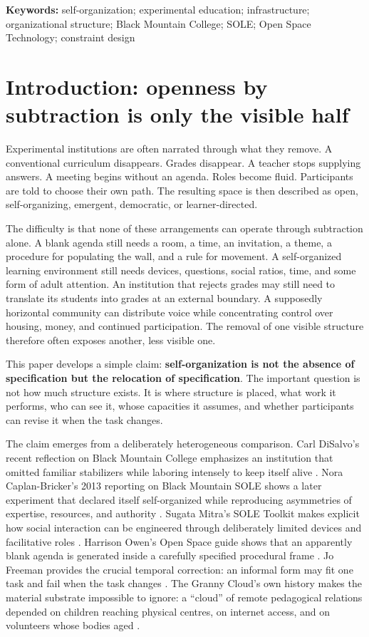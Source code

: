 \documentclass[11pt]{article}
\begin{document}
\textbf{Keywords:} self-organization; experimental education; infrastructure; organizational structure; Black Mountain College; SOLE; Open Space Technology; constraint design

\section{Introduction: openness by subtraction is only the visible half}

Experimental institutions are often narrated through what they remove. A conventional curriculum disappears. Grades disappear. A teacher stops supplying answers. A meeting begins without an agenda. Roles become fluid. Participants are told to choose their own path. The resulting space is then described as open, self-organizing, emergent, democratic, or learner-directed.

The difficulty is that none of these arrangements can operate through subtraction alone. A blank agenda still needs a room, a time, an invitation, a theme, a procedure for populating the wall, and a rule for movement. A self-organized learning environment still needs devices, questions, social ratios, time, and some form of adult attention. An institution that rejects grades may still need to translate its students into grades at an external boundary. A supposedly horizontal community can distribute voice while concentrating control over housing, money, and continued participation. The removal of one visible structure therefore often exposes another, less visible one.

This paper develops a simple claim: \textbf{self-organization is not the absence of specification but the relocation of specification}. The important question is not how much structure exists. It is where structure is placed, what work it performs, who can see it, whose capacities it assumes, and whether participants can revise it when the task changes.

The claim emerges from a deliberately heterogeneous comparison. Carl DiSalvo's recent reflection on Black Mountain College emphasizes an institution that omitted familiar stabilizers while laboring intensely to keep itself alive \cite{disalvo2026blackmountainmess}. Nora Caplan-Bricker's 2013 reporting on Black Mountain SOLE shows a later experiment that declared itself self-organized while reproducing asymmetries of expertise, resources, and authority \cite{caplanbricker2013blackmountain}. Sugata Mitra's SOLE Toolkit makes explicit how social interaction can be engineered through deliberately limited devices and facilitative roles \cite{mitra_sole_toolkit}. Harrison Owen's Open Space guide shows that an apparently blank agenda is generated inside a carefully specified procedural frame \cite{owen_open_space_guide}. Jo Freeman provides the crucial temporal correction: an informal form may fit one task and fail when the task changes \cite{freeman1972tyranny}. The Granny Cloud's own history makes the material substrate impossible to ignore: a ``cloud'' of remote pedagogical relations depended on children reaching physical centres, on internet access, and on volunteers whose bodies aged \cite{grannycloud_background}.
\end{document}
